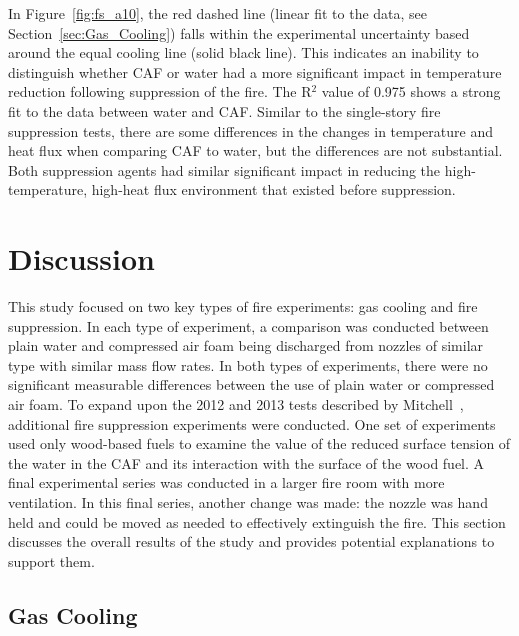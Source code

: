 \documentclass[12pt,oneside]{book}
\begin{document}
In Figure~\ref{fig:fs_a10}, the red dashed line (linear fit to the data, see Section~\ref{sec:Gas_Cooling}) falls within the experimental uncertainty based around the equal cooling line (solid black line). This indicates an inability to distinguish whether CAF or water had a more significant impact in temperature reduction following suppression of the fire. The R$^2$ value of 0.975 shows a strong fit to the data between water and CAF. Similar to the single-story fire suppression tests, there are some differences in the changes in temperature and heat flux when comparing CAF to water, but the differences are not substantial. Both suppression agents had similar significant impact in reducing the high-temperature, high-heat flux environment that existed before suppression. 

\chapter{Discussion}
\label{chap:Discussion}

This study focused on two key types of fire experiments: gas cooling and fire suppression. In each type of experiment, a comparison was conducted between plain water and compressed air foam being discharged from nozzles of similar type with similar mass flow rates. In both types of experiments, there were no significant measurable differences between the use of plain water or compressed air foam. To expand upon the 2012 and 2013 tests described by Mitchell~\cite{Mitchell:1}, additional fire suppression experiments were conducted. One set of experiments used only wood-based fuels to examine the value of the reduced surface tension of the water in the CAF and its interaction with the surface of the wood fuel. A final experimental series was conducted in a larger fire room with more ventilation. In this final series, another change was made: the nozzle was hand held and could be moved as needed to effectively extinguish the fire. This section discusses the overall results of the study and provides potential explanations to support them.

\section{Gas Cooling}
\label{sec:Gas_Cooling_discuss}
 
\end{document}
